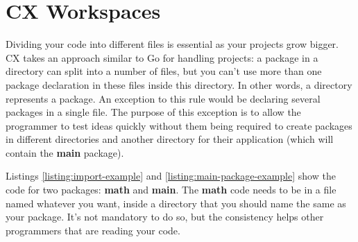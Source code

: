 \documentclass[11pt,fleqn,openany]{book} %
\begin{document}
\section{CX Workspaces}
\label{section:cx-workspaces}


Dividing your code into different files is essential as your projects grow bigger. CX takes an approach similar to Go for handling projects: a package in a directory can split into a number of files, but you can't use more than one package declaration in these files inside this directory. In other words, a directory represents a package. An exception to this rule would be declaring several packages in a single file. The purpose of this exception is to allow the programmer to test ideas quickly without them being required to create packages in different directories and another directory for their application (which will contain the \textbf{main} package).

Listings \ref{listing:import-example} and \ref{listing:main-package-example} show the code for two packages: \textbf{math} and \textbf{main}. The \textbf{math} code needs to be in a file named whatever you want, inside a directory that you should name the same as your package. It's not mandatory to do so, but the consistency helps other programmers that are reading your code.
\end{document}
